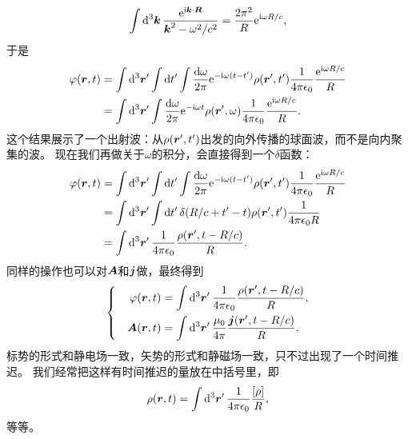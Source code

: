 \documentclass[UTF8, a4paper]{ctexart}
\newcommand*{\ee}{\mathrm{e}}
\newcommand*{\ii}{\mathrm{i}}
\newenvironment{bigcase}{\left\{\quad\begin{aligned}}{\end{aligned}\right.}
\begin{document}
\[
    \int \dd[3]{\vb*{k}} \frac{\ee^{\ii \vb*{k} \cdot \vb*{R}}}{\vb*{k}^2 - \omega^2/c^2} = \frac{2 \pi^2}{R} \ee^{\ii \omega R / c}, 
\]
于是
\begin{equation}
    \begin{aligned}
        \varphi(\vb*{r}, t) &= \int \dd[3]{\vb*{r}'} \int \dd{t'} \int \frac{\dd{\omega}}{2\pi} \ee^{-\ii \omega (t-t')} \rho(\vb*{r}', t') \frac{1}{4\pi \epsilon_0} \frac{\ee^{\ii \omega R / c}}{R} \\
        &= \int \dd[3]{\vb*{r}'} \int \frac{\dd{\omega}}{2\pi} \ee^{- \ii \omega t} \rho(\vb*{r}', \omega) \frac{1}{4\pi \epsilon_0} \frac{\ee^{\ii \omega R / c}}{R}.
    \end{aligned}
\end{equation}
这个结果展示了一个出射波：从$\rho(\vb*{r}', t')$出发的向外传播的球面波，而不是向内聚集的波。
现在我们再做关于$\omega$的积分，会直接得到一个$\delta$函数：
\[
    \begin{aligned}
        \varphi(\vb*{r}, t) &= \int \dd[3]{\vb*{r}'} \int \dd{t'} \int \frac{\dd{\omega}}{2\pi} \ee^{-\ii \omega (t-t')} \rho(\vb*{r}', t') \frac{1}{4\pi \epsilon_0} \frac{\ee^{\ii \omega R / c}}{R} \\
        &= \int \dd[3]{\vb*{r}'} \int \dd{t'} \delta(R/c + t' - t) \rho(\vb*{r}', t') \frac{1}{4\pi \epsilon_0 R} \\
        &= \int \dd[3]{\vb*{r}'} \frac{1}{4\pi \epsilon_0} \frac{\rho(\vb*{r}', t - R / c)}{R}.
    \end{aligned}
\]
同样的操作也可以对$\vb*{A}$和$\vb*{j}$做，最终得到
\begin{equation}
    \begin{bigcase}
        \varphi(\vb*{r}, t) &= \int \dd[3]{\vb*{r}'} \frac{1}{4\pi \epsilon_0} \frac{\rho(\vb*{r}', t - R / c)}{R}, \\
        \vb*{A}(\vb*{r}, t) &= \int \dd[3]{\vb*{r}'} \frac{\mu_0}{4\pi} \frac{\vb*{j}(\vb*{r}', t - R / c)}{R}.
    \end{bigcase}
    \label{eq:general-solution-wave}
\end{equation}
标势的形式和静电场一致，矢势的形式和静磁场一致，只不过出现了一个时间推迟。
我们经常把这样有时间推迟的量放在中括号里，即
\[
    \rho(\vb*{r}, t) = \int \dd[3]{\vb*{r}'} \frac{1}{4\pi \epsilon_0} \frac{[\rho]}{R},
\]
等等。
\end{document}
